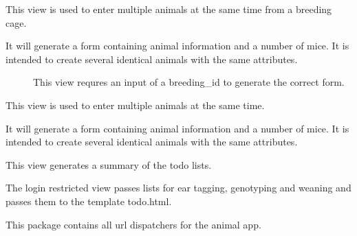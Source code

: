 \documentclass[letterpaper,10pt,english]{sphinxmanual}
\begin{document}

\begin{fulllineitems}
\label{api:mousedb.animal.views.multiple_breeding_pups}
This view is used to enter multiple animals at the same time from a breeding cage.
\begin{description}
\item[{It will generate a form containing animal information and a number of mice.  It is intended to create several identical animals with the same attributes.}] \leavevmode
This view requres an input of a breeding\_id to generate the correct form.

\end{description}

\end{fulllineitems}


\begin{fulllineitems}
\label{api:mousedb.animal.views.multiple_pups}
This view is used to enter multiple animals at the same time.

It will generate a form containing animal information and a number of mice.  It is intended to create several identical animals with the same attributes.

\end{fulllineitems}


\begin{fulllineitems}
\label{api:mousedb.animal.views.todo}
This view generates a summary of the todo lists.

The login restricted view passes lists for ear tagging, genotyping and weaning and passes them to the template todo.html.

\end{fulllineitems}

\label{api:module-mousedb.animal.urls}
This package contains all url dispatchers for the animal app.
\end{document}
